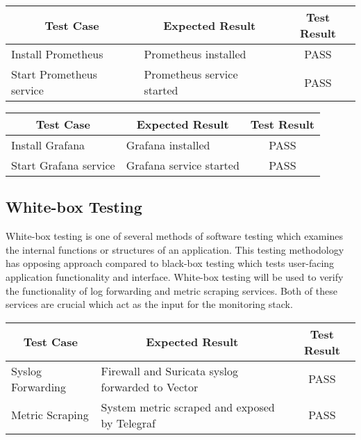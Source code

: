 \documentclass[../index.tex]{subfiles}
\begin{document}
\begin{center}
  \begin{tabular}{|l|l|c|} 
    \hline
    \multicolumn{1}{|c|}{Test Case} & \multicolumn{1}{c|}{Expected Result} & \multicolumn{1}{c|}{Test Result} \\
    \hline
    Install Prometheus              & Prometheus installed                 & PASS \\ 
    Start Prometheus service        & Prometheus service started           & PASS \\ 
    \hline
  \end{tabular}
  \label{table:blackbox_prometheus}
\end{center}

\begin{center}
  \begin{tabular}{|l|l|c|} 
    \hline
    \multicolumn{1}{|c|}{Test Case} & \multicolumn{1}{c|}{Expected Result} & \multicolumn{1}{c|}{Test Result} \\
    \hline
    Install Grafana                 & Grafana installed                    & PASS \\ 
    Start Grafana service           & Grafana service started              & PASS \\ 
    \hline
  \end{tabular}
  \label{table:blackbox_grafana}
\end{center}

\subsection{White-box Testing}

White-box testing is one of several methods of software testing which examines the internal
functions or structures of an application. This testing methodology has opposing approach compared
to black-box testing which tests user-facing application functionality and interface. White-box
testing will be used to verify the functionality of log forwarding and metric scraping services.
Both of these services are crucial which act as the input for the monitoring stack.

\begin{center}
  \begin{tabular}{|l|l|c|} 
    \hline
    \multicolumn{1}{|c|}{Test Case} & \multicolumn{1}{c|}{Expected Result} & \multicolumn{1}{c|}{Test Result} \\
    \hline
    Syslog Forwarding               & Firewall and Suricata syslog forwarded to Vector & PASS \\ 
    Metric Scraping                 & System metric scraped and exposed by Telegraf & PASS \\ 
    \hline
  \end{tabular}
  \label{table:whitebox_opnsense}
\end{center}
\end{document}

